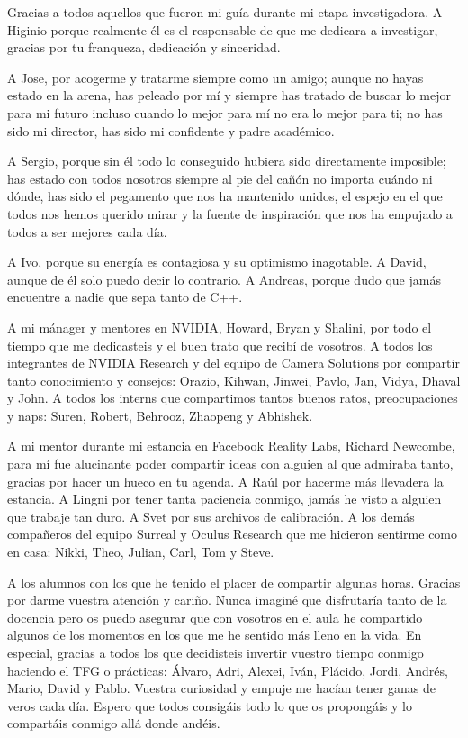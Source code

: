 Gracias a todos aquellos que fueron mi guía durante mi etapa investigadora. A Higinio porque realmente él es el responsable de que me dedicara a investigar, gracias por tu franqueza, dedicación y sinceridad.

A Jose, por acogerme y tratarme siempre como un amigo; aunque no hayas estado en la arena, has peleado por mí y siempre has tratado de buscar lo mejor para mi futuro incluso cuando lo mejor para mí no era lo mejor para ti; no has sido mi director, has sido mi confidente y padre académico.

A Sergio, porque sin él todo lo conseguido hubiera sido directamente imposible; has estado con todos nosotros siempre al pie del cañón no importa cuándo ni dónde, has sido el pegamento que nos ha mantenido unidos, el espejo en el que todos nos hemos querido mirar y la fuente de inspiración que nos ha empujado a todos a ser mejores cada día.

A Ivo, porque su energía es contagiosa y su optimismo inagotable. A David, aunque de él solo puedo decir lo contrario. A Andreas, porque dudo que jamás encuentre a nadie que sepa tanto de C++.

A mi mánager y mentores en NVIDIA, Howard, Bryan y Shalini, por todo el tiempo que me dedicasteis y el buen trato que recibí de vosotros. A todos los integrantes de NVIDIA Research y del equipo de Camera Solutions por compartir tanto conocimiento y consejos: Orazio, Kihwan, Jinwei, Pavlo, Jan, Vidya, Dhaval y John. A todos los interns que compartimos tantos buenos ratos, preocupaciones y naps: Suren, Robert, Behrooz, Zhaopeng y Abhishek.

A mi mentor durante mi estancia en Facebook Reality Labs, Richard Newcombe, para mí fue alucinante poder compartir ideas con alguien al que admiraba tanto, gracias por hacer un hueco en tu agenda. A Raúl por hacerme más llevadera la estancia. A Lingni por tener tanta paciencia conmigo, jamás he visto a alguien que trabaje tan duro. A Svet por sus archivos de calibración. A los demás compañeros del equipo Surreal y Oculus Research que me hicieron sentirme como en casa: Nikki, Theo, Julian, Carl, Tom y Steve.

A los alumnos con los que he tenido el placer de compartir algunas horas. Gracias por darme vuestra atención y cariño. Nunca imaginé que disfrutaría tanto de la docencia pero os puedo asegurar que con vosotros en el aula he compartido algunos de los momentos en los que me he sentido más lleno en la vida. En especial, gracias a todos los que decidisteis invertir vuestro tiempo conmigo haciendo el TFG o prácticas: Álvaro, Adri, Alexei, Iván, Plácido, Jordi, Andrés, Mario, David y Pablo. Vuestra curiosidad y empuje me hacían tener ganas de veros cada día. Espero que todos consigáis todo lo que os propongáis y lo compartáis conmigo allá donde andéis.

